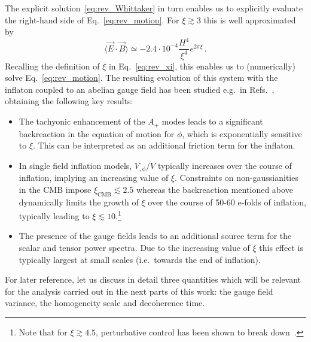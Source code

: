 The explicit solution~\eqref{eq:rev_Whittaker} in turn enables us to explicitly evaluate the right-hand side of Eq.~\eqref{eq:rev_motion}. For $\xi \gtrsim 3$ this is well approximated by
\begin{equation}
 \langle \vec E \cdot \vec B \rangle  \simeq - 2.4 \cdot 10^{-4} \frac{H^4}{\xi^4} e^{2 \pi \xi} \,.
 \label{eq:rev_EB}
\end{equation}
Recalling the definition of $\xi$ in Eq.~\eqref{eq:rev_xi}, this enables us to (numerically) solve Eq.~\eqref{eq:rev_motion}. 
The resulting evolution of 
this system with the inflaton coupled to an abelian gauge field 
has been studied e.g.\ in Refs.~\cite{Anber:2009ua,Barnaby:2010vf,Cook:2011hg,Barnaby:2011qe,Anber:2012du,Linde:2012bt,Domcke:2016bkh}, obtaining the following key results:
\begin{itemize}
 \item The tachyonic enhancement of the $A_+$ modes leads to a significant backreaction in the equation of motion for $\phi$, which is exponentially sensitive to $\xi$. This can be interpreted as an additional friction term for the inflaton.
 \item In single field inflation models, $V_{,\phi}/V$ typically increases over the course of inflation, implying an increasing value of $\xi$. Constraints on non-gaussianities in the CMB impose $\xi_\text{CMB} \lesssim 2.5$ whereas the backreaction mentioned above dynamically limits the growth of $\xi$ over the course of 50-60 e-folds of inflation, typically leading to $\xi \lesssim 10$.\footnote{Note that for $\xi \gtrsim 4.5$, perturbative control has been shown to break down~\cite{Ferreira:2015omg, Peloso:2016gqs}.}
 \item The presence of the gauge fields leads to an additional source term for the scalar and tensor power spectra. Due to the increasing value of $\xi$ this effect is typically largest at small scales (i.e.\ towards the end of inflation).
\end{itemize}

For later reference, let us discuss in detail three quantities which will be relevant for the analysis carried out in the next parts of this work: the gauge field variance, the homogeneity scale and decoherence time.


